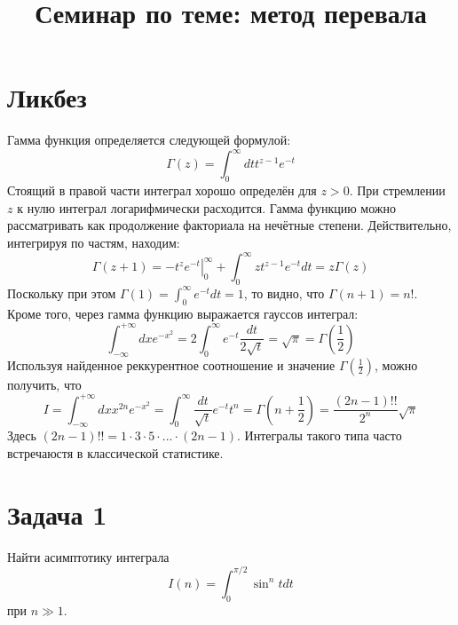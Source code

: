 \documentclass[a4paper,12pt]{article}
\begin{document}
\title{Семинар по теме: метод перевала}
\maketitle

\section*{Ликбез}
Гамма функция определяется следующей формулой:
$$
\Gamma(z)=\int_0^{\infty}dt t^{z-1} e^{-t}
$$
Стоящий в правой части интеграл хорошо определён для $z>0$. При стремлении $z$ к нулю интеграл логарифмически расходится. Гамма функцию можно рассматривать как продолжение факториала на нечётные степени. Действительно, интегрируя по частям, находим:
$$
\Gamma(z+1)=-\left.t^z e^{-t}\right|_{0}^{\infty} + \int_0^{\infty}zt^{z-1}e^{-t}dt=z\Gamma(z)
$$
Поскольку при этом $\Gamma(1)=\int_{0}^{\infty}e^{-t}dt=1$, то видно, что $\Gamma(n+1)=n!$. Кроме того, через гамма функцию выражается гауссов интеграл:
$$
\int_{-\infty}^{+\infty}dx e^{-x^2}=2\int_{0}^{\infty}e^{-t}\frac{dt}{2\sqrt{t}}=\sqrt{\pi}=\Gamma\left(\frac{1}{2}\right)
$$
Используя найденное реккурентное соотношение и значение $\Gamma\left(\frac{1}{2}\right)$, можно получить, что 
$$
I=\int_{-\infty}^{+\infty}dx x^{2n}e^{-x^2}=\int_{0}^{\infty}\frac{dt}{\sqrt{t}} e^{-t} t^{n}=\Gamma\left(n+\frac{1}{2}\right)=\frac{(2n-1)!!}{2^{n}}\sqrt{\pi}
$$
Здесь $(2n-1)!!=1\cdot 3\cdot 5\cdot...\cdot(2n-1)$. Интегралы такого типа часто встречаюстя в классической статистике.
\section{Задача 1}

Найти асимптотику интеграла 
\[
I(n)=\int_{0}^{\pi/2}\sin^n t dt
\]
при $n\gg 1$.
\end{document}
